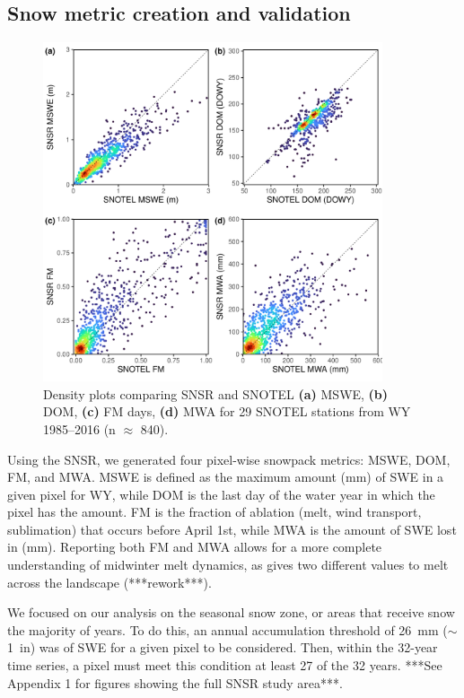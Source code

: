 
\hypertarget{ch2-methods-1}{\subsection{Snow metric creation and validation}\label{ch2-methods-1}}

\begin{figure}[t]
\centering
\includegraphics[width=10cm]{figures/ch2_figs/snsr_snotel_metric_compare_new_v1.pdf}
\caption{Density plots comparing SNSR and SNOTEL \textbf{(a)} MSWE, \textbf{(b)} DOM, \textbf{(c)} FM days, \textbf{(d)} MWA for 29 SNOTEL stations from WY 1985--2016 (n $\approx$ 840).}
\label{kuy_study_area}
\end{figure}

Using the SNSR, we generated four pixel-wise snowpack metrics: MSWE, DOM, FM, and MWA. MSWE is defined as the maximum amount (mm) of SWE in a given pixel for WY, while DOM is the last day of the water year in which the pixel has the amount. FM is the fraction of ablation (melt, wind transport, sublimation) that occurs before April 1st, while MWA is the amount of SWE lost in (mm). Reporting both FM and MWA allows for a more complete understanding of midwinter melt dynamics, as gives two different values to melt across the landscape (***rework***).

We focused on our analysis on the seasonal snow zone, or areas that receive snow the majority of years. To do this, an annual accumulation threshold of 26~mm ($\sim$1~in) was of SWE for a given pixel to be considered. Then, within the 32-year time series, a pixel must meet this condition at least 27 of the 32 years. ***See Appendix 1 for figures showing the full SNSR study area***. 

